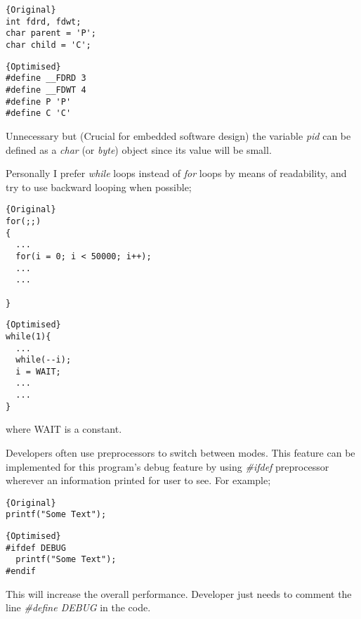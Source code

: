 \documentclass[11pt]{article}
\begin{document}
\noindent\begin{minipage}{.45\textwidth}
\begin{lstlisting}[caption=Original,frame=tlrb]{Original}
int fdrd, fdwt;
char parent = 'P';
char child = 'C';
\end{lstlisting}
\end{minipage}\hfill
\begin{minipage}{.50\textwidth}
\begin{lstlisting}[caption=Optimised,frame=tlrb]{Optimised}
#define __FDRD 3
#define __FDWT 4
#define P 'P'
#define C 'C'
\end{lstlisting}
\end{minipage}

Unnecessary but (Crucial for embedded software design) the variable \textit{pid} can be defined as a \textit{char} (or \textit{byte}) object since its value will be small.

Personally I prefer \textit{while} loops instead of \textit{for} loops by means of readability, and try to use backward looping when possible;

\noindent\begin{minipage}{.45\textwidth}
\begin{lstlisting}[caption=Original,frame=tlrb]{Original}
for(;;)
{
  ...
  for(i = 0; i < 50000; i++);
  ...
  ...

}
\end{lstlisting}
\end{minipage}\hfill
\begin{minipage}{.50\textwidth}
\begin{lstlisting}[caption=Optimised,frame=tlrb]{Optimised}
while(1){
  ...
  while(--i);
  i = WAIT;
  ...
  ...
}
\end{lstlisting}
\end{minipage}
where WAIT is a constant.

Developers often use preprocessors to switch between modes. This feature can be implemented for this program's debug feature by using \textit{\#ifdef} preprocessor wherever an information printed for user to see. For example;

\noindent\begin{minipage}{.45\textwidth}
\begin{lstlisting}[caption=Original,frame=tlrb]{Original}
printf("Some Text");
\end{lstlisting}
\end{minipage}\hfill
\begin{minipage}{.50\textwidth}
\begin{lstlisting}[caption=Optimised,frame=tlrb]{Optimised}
#ifdef DEBUG
  printf("Some Text");
#endif
\end{lstlisting}
\end{minipage}
This will increase the overall performance. Developer just needs to comment the line \textit{\#define DEBUG} in the code.
\end{document}
